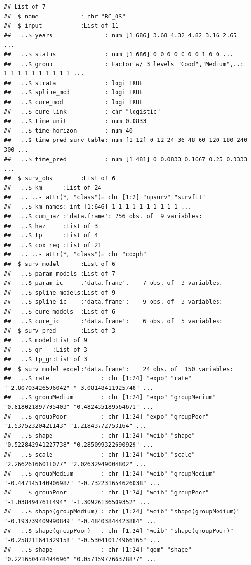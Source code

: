 \documentclass[
]{article}
\begin{document}
\begin{verbatim}
## List of 7
##  $ name            : chr "BC_OS"
##  $ input           :List of 11
##   ..$ years               : num [1:686] 3.68 4.32 4.82 3.16 2.65 ...
##   ..$ status              : num [1:686] 0 0 0 0 0 0 0 1 0 0 ...
##   ..$ group               : Factor w/ 3 levels "Good","Medium",..: 1 1 1 1 1 1 1 1 1 1 ...
##   ..$ strata              : logi TRUE
##   ..$ spline_mod          : logi TRUE
##   ..$ cure_mod            : logi TRUE
##   ..$ cure_link           : chr "logistic"
##   ..$ time_unit           : num 0.0833
##   ..$ time_horizon        : num 40
##   ..$ time_pred_surv_table: num [1:12] 0 12 24 36 48 60 120 180 240 300 ...
##   ..$ time_pred           : num [1:481] 0 0.0833 0.1667 0.25 0.3333 ...
##  $ surv_obs        :List of 6
##   ..$ km      :List of 24
##   .. ..- attr(*, "class")= chr [1:2] "npsurv" "survfit"
##   ..$ km_names: int [1:646] 1 1 1 1 1 1 1 1 1 1 ...
##   ..$ cum_haz :'data.frame': 256 obs. of  9 variables:
##   ..$ haz     :List of 3
##   ..$ tp      :List of 4
##   ..$ cox_reg :List of 21
##   .. ..- attr(*, "class")= chr "coxph"
##  $ surv_model      :List of 6
##   ..$ param_models :List of 7
##   ..$ param_ic     :'data.frame':    7 obs. of  3 variables:
##   ..$ spline_models:List of 9
##   ..$ spline_ic    :'data.frame':    9 obs. of  3 variables:
##   ..$ cure_models  :List of 6
##   ..$ cure_ic      :'data.frame':    6 obs. of  5 variables:
##  $ surv_pred       :List of 3
##   ..$ model:List of 9
##   ..$ gr   :List of 3
##   ..$ tp_gr:List of 3
##  $ surv_model_excel:'data.frame':    24 obs. of  150 variables:
##   ..$ rate               : chr [1:24] "expo" "rate" "-2.80703426596042" "-3.08148411925748" ...
##   ..$ groupMedium        : chr [1:24] "expo" "groupMedium" "0.818021897705403" "0.482435189564671" ...
##   ..$ groupPoor          : chr [1:24] "expo" "groupPoor" "1.53752320421143" "1.21843772753164" ...
##   ..$ shape              : chr [1:24] "weib" "shape" "0.522842941227738" "0.285099322690929" ...
##   ..$ scale              : chr [1:24] "weib" "scale" "2.26626166011077" "2.02632949004802" ...
##   ..$ groupMedium        : chr [1:24] "weib" "groupMedium" "-0.447145140906987" "-0.732231654626038" ...
##   ..$ groupPoor          : chr [1:24] "weib" "groupPoor" "-1.0384947611494" "-1.30926136509352" ...
##   ..$ shape(groupMedium) : chr [1:24] "weib" "shape(groupMedium)" "-0.193739409990849" "-0.48403844423884" ...
##   ..$ shape(groupPoor)   : chr [1:24] "weib" "shape(groupPoor)" "-0.258211641329158" "-0.530410174966165" ...
##   ..$ shape              : chr [1:24] "gom" "shape" "0.221650478494696" "0.0571597766378877" ...

\end{verbatim}
\end{document}
